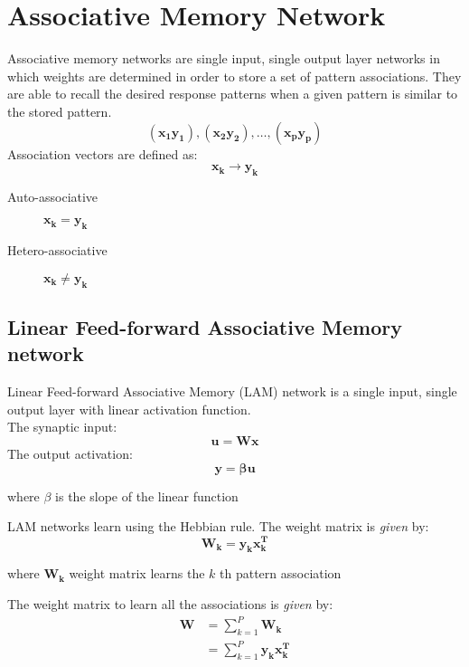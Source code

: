\chapter{Associative Memory Network}
Associative memory networks are single input, single output layer networks in which weights are determined in order to store a set of pattern associations. They are able to recall the desired response patterns when a given pattern is similar to the stored pattern. 
$$\mathbf{{(x_1 y_1), (x_2 y_2), \ldots, (x_p y_p)}}$$
Association vectors are defined as:
$$\mathbf{x_k \rightarrow y_k}$$
\begin{description}
\item[Auto-associative] $\mathbf{x_k = y_k}$
\item[Hetero-associative] $\mathbf{x_k \ne y_k}$
\end{description}

\section{Linear Feed-forward Associative Memory network}
Linear Feed-forward Associative Memory (LAM) network is a single input, single output layer with linear activation function. \\
The synaptic input:
$$\mathbf{u=Wx}$$
The output activation:
$$\mathbf{y=\beta u}$$
\begin{center} where $\beta$ is the slope of the linear function\end{center}
\clearpage
\noindent LAM networks learn using the Hebbian rule. The weight matrix is \emph{given} by:
$$\mathbf{W_k = y_k x_k^{T}}$$
\begin{center} where $\mathbf{W_k}$ weight matrix learns the $k$ th pattern association\end{center}
The weight matrix to learn all the associations is \emph{given} by:
\begin{equation*}
\begin{split}
\mathbf{W} &= \sum_{k=1}^{P} \mathbf{W_k} \\
&= \sum_{k=1}^{P} \mathbf{y_k x_k^{T}}
\end{split}
\label{weight_lam}
\end{equation*}


